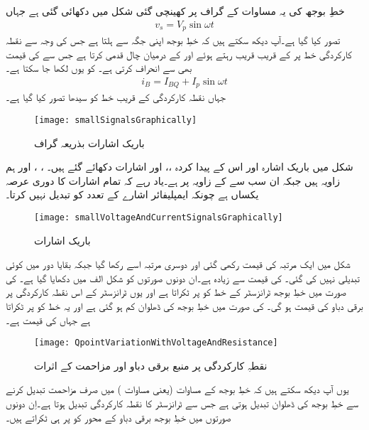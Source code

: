 خطِ بوجھ کی یہ مساوات   کے گراف پر کھینچی گئی شکل   میں دکھائی گئی ہے جہاں
\begin{align}
v_s = V_p \sin \omega t
\end{align}
تصور کیا گیا ہے۔آپ دیکھ سکتے ہیں کہ خطِ بوجھ اپنی جگہ سے ہلتا ہے جس کی وجہ سے نقطہ کارکردگی  خط پر   کے قریب قریب رہتے ہوئے  اور  کے درمیان چال قدمی کرتا ہے جس سے  کی قیمت بھی  سے انحراف کرتی ہے۔  کو یوں لکھا جا سکتا ہے۔
\begin{align}
i_B = I_{BQ}+I_p \sin \omega t
\end{align}
جہاں نقطہ کارکردگی کے قریب   خط کو سیدھا تصور کیا گیا ہے۔
\begin{figure}
\centering
\texttt{[image: smallSignalsGraphically]}
\caption{باریک اشارات بذریعہ گراف}
\label{شکل_باریک_اشارات_بذریعہ_گراف}
\end{figure}
شکل   میں باریک اشارہ  اور اس کے پیدا کردہ  ،،  اور  اشارات دکھائے گئے ہیں۔ ،  ،  اور  ہم  زاویہ  ہیں جبکہ  ان سب سے  کے زاویہ پر ہے۔یاد رہے کہ تمام اشارات کا دوری عرصہ  یکساں ہے چونکہ ایمپلیفائر اشارے کے تعدد کو تبدیل نہیں کرتا۔ 
\begin{figure}
\centering
\texttt{[image: smallVoltageAndCurrentSignalsGraphically]}
\caption{باریک اشارات}
\label{شکل_دیگر_باریک_اشارات}
\end{figure}

شکل   میں ایک مرتبہ  کی قیمت  رکھی گئی اور دوسری مرتبہ اسے  رکھا گیا جبکہ بقایا دور میں کوئی تبدیلی نہیں کی گئی۔  کی قیمت  سے زیادہ ہے۔ان دونوں صورتوں کو شکل  الف میں دکھایا گیا ہے۔  کی صورت میں خطِ بوجھ ٹرانزسٹر کے  خط کو  پر ٹکراتا ہے اور یوں ٹرانزسٹر کے اس نقطہ کارکردگی پر برقی دباو  کی قیمت  ہو گی۔  کی صورت میں خطِ بوجھ کی ڈھلوان کم ہو گئی ہے اور یہ  خط کو  پر ٹکراتا ہے جہاں  کی قیمت ہے۔
\begin{figure}
\centering
\texttt{[image: QpointVariationWithVoltageAndResistance]}
\caption{ نقطہِ کارکردگی پر منبع برقی دباو اور مزاحمت کے اثرات}
\label{شکل_نکتہ_کارکردگی_بالمقابل_برقی_دباو_اور_مزاحمت}
\end{figure}
یوں آپ دیکھ سکتے ہیں کہ خطِ بوجھ کے مساوات (یعنی مساوات  ) میں صرف مزاحمت تبدیل کرنے سے خطِ بوجھ کی ڈھلوان تبدیل ہوتی ہے جس سے ٹرانزسٹر کا نقطہ کارکردگی تبدیل ہوتا ہے۔اِن دونوں صورتوں میں خطِ بوجھ برقی دباو کے محور کو  پر ہی ٹکراتے ہیں۔

